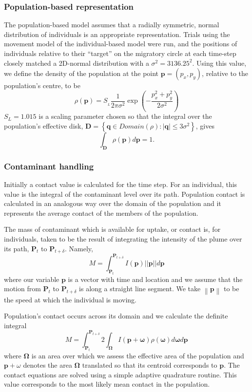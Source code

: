 \subsubsection{Population-based representation}

The population-based model assumes that a radially symmetric, normal
distribution of individuals is an appropriate representation. Trials using the
movement model of the individual-based model were run, and the positions of
individuals relative to their ``target'' on the migratory circle at each
time-step closely matched a 2D-normal distribution with a $\sigma^2 =
3136.25^2$. Using this value, we define the density of the population at the
point $\mathbf{p}= \left( p_x, p_y \right)$, relative to the population's centre, to be
\[ \rho ( \mathbf{p}) = S_{_L }^{} \frac{1}{2 \pi \sigma^2} \exp \left( - \frac{p_x^2 + p_y^2}{2 \sigma^2} \right) \]
$S_L = 1.015$ is a scaling parameter chosen so that the integral over the
population's effective disk, $\mathbf{D}= \left\{ \mathbf{q} \in {Domain} \left( \rho \right) : \left| \mathbf{q} \right| \leqslant 3 \sigma^2 \right\}$, gives
\[ \int_{\mathbf{D}} \rho \left( \mathbf{p} \right) d\mathbf{p}= 1. \]


\subsubsection{Contaminant handling}

Initially a contact value is calculated for the time step. For an individual,
this value is the integral of the contaminant level over its path. Population
contact is calculated in an analogous way over the domain of the population
and it represents the average contact of the members of the population.

The mass of contaminant which is available for uptake, or contact is, for
individuals, taken to be the result of integrating the intensity of the plume
over its path, $\mathbf{P}_t$ to $\mathbf{P}_{t + \delta}$. Namely,
\[ M = \int_{\mathbf{P}_t}^{\mathbf{P}_{t + \delta_{}}} I ( \mathbf{p}) ||\mathbf{p}|| d \mathbf{p}  \]
where our variable $\mathbf{p}$ is a vector with time and location and we
assume that the motion from $\mathbf{P}_t$ to $\mathbf{P}_{t + \delta}$ is
along a straight line segment. We take $\left\| \mathbf{p} \right\|$ to be the speed at which the
individual is moving.

Population's contact occurs across its domain and we calculate the definite
integral
\[ M = \int_{\mathbf{P}_t}^{\mathbf{P}_{t + \delta}} 2 \int_{\mathbf{\Omega}} I ( \mathbf{p + \omega}) \rho (   \mathbf{\omega}) d \mathbf{\omega} d \mathbf{p}^{}  \]
where $\mathbf{\Omega}$ is an area over which we assess the effective area
of the population and $\mathbf{p}+ \omega$ denotes the area
$\mathbf{\Omega}$ translated so that its centroid corresponds to
$\mathbf{p}$. The contact equations are solved using a simple adaptive
quadrature routine. This value corresponds to the most likely mean contact in
the population.

